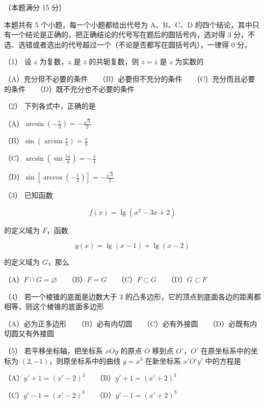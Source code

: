 \begin{question}
（本题满分 15 分）

本题共有 5 个小题，每一个小题都给出代号为 A、B、C、D 的四个结论，其中只有一个结论是正确的，把正确结论的代号写在题后的圆括号内，选对得 3 分，不选、选错或者选出的代号超过一个（不论是否都写在圆括号内），一律得 0 分。

（1） 设 $z$ 为复数，$z$ 是 $\overline z$ 的共轭复数，则 $z=\overline z$ 是 $z$ 为实数的

（A）充分但不必要的条件　　（B）必要但不充分的条件　　（C）充分而且必要的条件　　（D）既不充分也不必要的条件

（2） 下列各式中，正确的是

（A）$\arcsin\left(-\frac\pi3\right)=-\frac{\sqrt3}{2}$

（B）$\sin\left(\arcsin\frac\pi3\right)=\frac\pi3$

（C）$\arcsin\left(\sin\frac{5\pi}{4}\right)=-\frac\pi4$

（D）$\sin\left[\arccos\left(-\frac12\right)\right]=-\frac{\sqrt3}{2}$

（3） 已知函数

\nopagebreak[4]
\[
f(x)=\lg(x^2-3x+2)
\]

的定义域为 $F$，函数

\nopagebreak[4]
\[
g(x)=\lg(x-1)+\lg(x-2)
\]

的定义域为 $G$，那么

（A）$F\cap G=\varnothing$　　（B）$F=G$　　（C）$F\subset G$　　（D）$G\subset F$

（4） 若一个棱锥的底面是边数大于 3 的凸多边形，它的顶点到底面各边的距离都相等，则这个棱锥的底面多边形

（A）必为正多边形　　（B）必有内切圆　　（C）必有外接圆　　（D）必既有内切圆又有外接圆

（5） 若平移坐标轴，把坐标系 $xOy$ 的原点 $O$ 移到点 $O'$，$O'$ 在原坐标系中的坐标为 $(2,-1)$，则原坐标系中的曲线 $y=x^3$ 在新坐标系 $x'O'y'$ 中的方程是

（A）$y'+1=(x'-2)^3$　　（B）$y'+1=(x'+2)^3$

（C）$y'-1=(x'-2)^3$　　（D）$y'-1=(x'+2)^3$

\Needspace{0.4\textheight}
\end{question}
